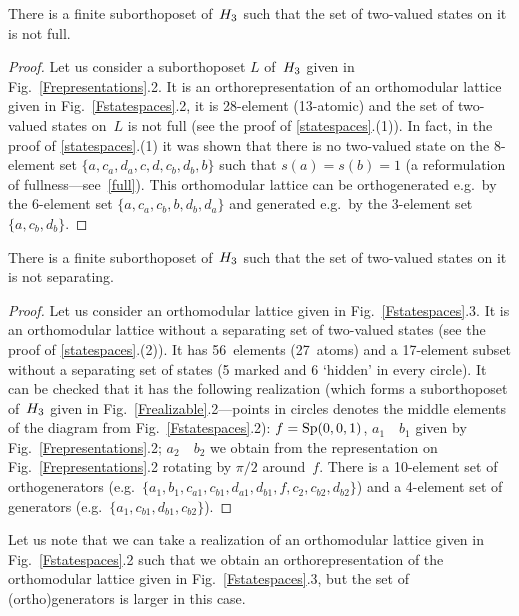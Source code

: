 \begin {proposition} \label{nofull}
There is a finite suborthoposet of~$H_3$ such that the set of two-valued
states on it is not full.
\end {proposition}


\begin {proof}
Let us consider a suborthoposet $L$ of~$H_3$ given in
Fig.~\ref{Frepresentations}.2. It is an orthorepresentation of an
orthomodular lattice given in Fig.~\ref{Fstatespaces}.2, it is 28-element
(13-atomic) and the set of two-valued states on~$L$ is not full (see the
proof of \ref{statespaces}.(1)). In fact, in the proof of
\ref{statespaces}.(1) it was shown that there is no two-valued state on the
8-element set $\{a,c_a,d_a,c,d,c_b,d_b,b\}$ such that $s(a)=s(b)=1$ (a
reformulation of fullness---see~\ref{full}). This orthomodular lattice
can be orthogenerated e.g.\ by the 6-element set $\{a,c_a,c_b,b,d_b,d_a\}$ and
generated e.g.\ by the 3-element set $\{a,c_b,d_b\}$.
\end {proof}


\begin {proposition} \label{noseparating}
There is a finite suborthoposet of~$H_3$ such that the set of two-valued
states on it is not separating.
\end {proposition}

\begin {proof}
Let us consider an orthomodular lattice given in Fig.~\ref{Fstatespaces}.3.
It is an orthomodular lattice without a separating set of two-valued states
(see the proof of \ref{statespaces}.(2)). It has 56~elements (27~atoms) and
a 17-element subset without a separating set of states (5 marked and 6
`hidden' in every circle). It can be checked that it has the following
realization (which forms a suborthoposet of~$H_3$ given in
Fig.~\ref{Frealizable}.2---points in circles denotes the middle elements of
the diagram from Fig.~\ref{Fstatespaces}.2): $f={\rm Sp}(0,0,1)$,
$a_1$~\usebox{\shortdiagram}~$b_1$ given by Fig.~\ref{Frepresentations}.2;
$a_2$~\usebox{\shortdiagram}~$b_2$ we obtain from the representation on
Fig.~\ref{Frepresentations}.2 rotating by $\pi/2$ around~$f$. There is a
10-element set of orthogenerators (e.g.\
$\{a_1,b_1,c_{a1},c_{b1},d_{a1},d_{b1},f,c_2,c_{b2},d_{b2}\}$) and a
4-element set of generators (e.g.\ $\{a_1,c_{b1},d_{b1},c_{b2}\}$).
\end {proof}


Let us note that we can take a realization of an orthomodular lattice given
in Fig.~\ref{Fstatespaces}.2 such that we obtain an orthorepresentation of
the orthomodular lattice given in Fig.~\ref{Fstatespaces}.3, but the set of
(ortho)generators is larger in this case.



